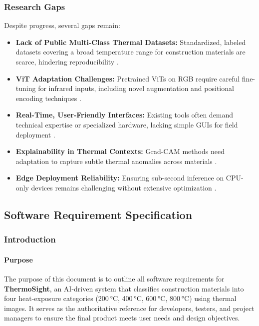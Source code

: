 \subsubsection{Research Gaps}
Despite progress, several gaps remain:
\begin{itemize}[leftmargin=*]
    \item \textbf{Lack of Public Multi-Class Thermal Datasets:} Standardized, labeled datasets covering a broad temperature range for construction materials are scarce, hindering reproducibility \cite{Li2023}.
    \item \textbf{ViT Adaptation Challenges:} Pretrained ViTs on RGB require careful fine-tuning for infrared inputs, including novel augmentation and positional encoding techniques \cite{Dosovitskiy2021,Liu2024}.
    \item \textbf{Real-Time, User-Friendly Interfaces:} Existing tools often demand technical expertise or specialized hardware, lacking simple GUIs for field deployment \cite{Liu2024}.
    \item \textbf{Explainability in Thermal Contexts:} Grad-CAM methods need adaptation to capture subtle thermal anomalies across materials \cite{Selvaraju2020,Chattopadhyay2018}.
    \item \textbf{Edge Deployment Reliability:} Ensuring sub-second inference on CPU-only devices remains challenging without extensive optimization \cite{Staecker2021}.
\end{itemize}

\subsection{Software Requirement Specification}

\subsubsection{Introduction}

\paragraph{Purpose}
The purpose of this document is to outline all software requirements for \textbf{ThermoSight}, an AI-driven system that classifies construction materials into four heat-exposure categories (200 °C, 400 °C, 600 °C, 800 °C) using thermal images. It serves as the authoritative reference for developers, testers, and project managers to ensure the final product meets user needs and design objectives.

